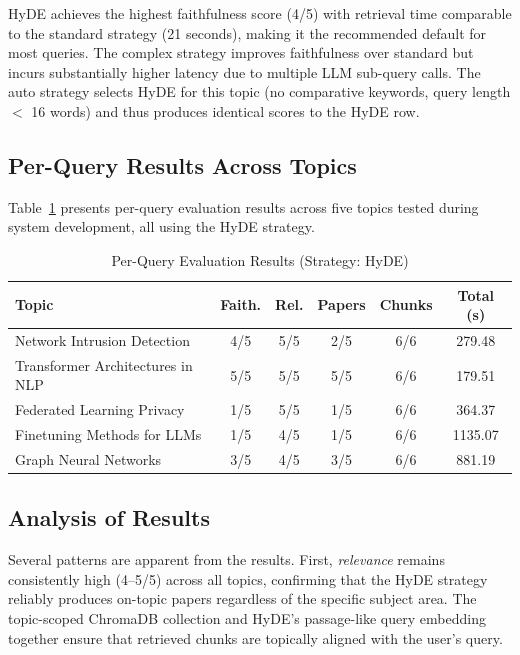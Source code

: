 \documentclass[12pt, a4paper]{article}
\begin{document}
HyDE achieves the highest faithfulness score (4/5) with retrieval time comparable
to the standard strategy (21 seconds), making it the recommended default for
most queries. The complex strategy improves faithfulness over standard but incurs
substantially higher latency due to multiple LLM sub-query calls. The auto strategy
selects HyDE for this topic (no comparative keywords, query length $<$ 16 words)
and thus produces identical scores to the HyDE row.

\subsection{Per-Query Results Across Topics}

Table~\ref{tab:perquery} presents per-query evaluation results across five topics
tested during system development, all using the HyDE strategy.

\begin{table}[h]
  \centering
  \caption{Per-Query Evaluation Results (Strategy: HyDE)}
  \label{tab:perquery}
  \begin{tabular}{lccccc}
    \toprule
    \textbf{Topic} & \textbf{Faith.} & \textbf{Rel.}
                   & \textbf{Papers} & \textbf{Chunks} & \textbf{Total (s)} \\
    \midrule
    Network Intrusion Detection      & 4/5 & 5/5 & 2/5 & 6/6 & 279.48  \\
    Transformer Architectures in NLP & 5/5 & 5/5 & 5/5 & 6/6 & 179.51  \\
    Federated Learning Privacy       & 1/5 & 5/5 & 1/5 & 6/6 & 364.37  \\
    Finetuning Methods for LLMs      & 1/5 & 4/5 & 1/5 & 6/6 & 1135.07 \\
    Graph Neural Networks            & 3/5 & 4/5 & 3/5 & 6/6 & 881.19  \\
    \bottomrule
  \end{tabular}
\end{table}

\subsection{Analysis of Results}

Several patterns are apparent from the results. First, \textit{relevance} remains
consistently high (4--5/5) across all topics, confirming that the HyDE strategy
reliably produces on-topic papers regardless of the specific subject area. The
topic-scoped ChromaDB collection and HyDE's passage-like query embedding together
ensure that retrieved chunks are topically aligned with the user's query.
\end{document}
